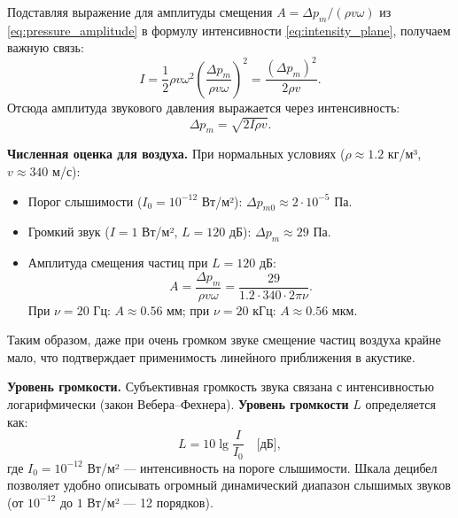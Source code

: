 \begin{property}
Подставляя выражение для амплитуды смещения $A = \Delta p_m / (\rho v \omega)$ из \eqref{eq:pressure_amplitude} в формулу интенсивности \eqref{eq:intensity_plane}, получаем важную связь:
\begin{equation}
    I = \frac{1}{2} \rho v \omega^2 \left(\frac{\Delta p_m}{\rho v \omega}\right)^2 = \frac{(\Delta p_m)^2}{2 \rho v}. \label{eq:intensity_pressure}
\end{equation}
Отсюда амплитуда звукового давления выражается через интенсивность:
\begin{equation}
    \Delta p_m = \sqrt{2 I \rho v}. \label{eq:pressure_from_intensity}
\end{equation}
\end{property}

\begin{remark}
\textbf{Численная оценка для воздуха.} При нормальных условиях ($\rho \approx 1.2$ кг/м³, $v \approx 340$ м/с):
\begin{itemize}
    \item Порог слышимости ($I_0 = 10^{-12}$ Вт/м²): $\Delta p_{m0} \approx 2 \cdot 10^{-5}$ Па.
    \item Громкий звук ($I = 1$ Вт/м², $L = 120$ дБ): $\Delta p_m \approx 29$ Па.
    \item Амплитуда смещения частиц при $L = 120$ дБ:
    \begin{equation}
        A = \frac{\Delta p_m}{\rho v \omega} = \frac{29}{1.2 \cdot 340 \cdot 2\pi \nu}.
    \end{equation}
    При $\nu = 20$ Гц: $A \approx 0.56$ мм; при $\nu = 20$ кГц: $A \approx 0.56$ мкм.
\end{itemize}
Таким образом, даже при очень громком звуке смещение частиц воздуха крайне мало, что подтверждает применимость линейного приближения в акустике.
\end{remark}

\begin{remark}
\textbf{Уровень громкости.} Субъективная громкость звука связана с интенсивностью логарифмически (закон Вебера--Фехнера). \textbf{Уровень громкости} $L$ определяется как:
\begin{equation}
    L = 10 \lg \frac{I}{I_0} \quad \text{[дБ]}, \label{eq:loudness_level}
\end{equation}
где $I_0 = 10^{-12}$ Вт/м² --- интенсивность на пороге слышимости. Шкала децибел позволяет удобно описывать огромный динамический диапазон слышимых звуков (от $10^{-12}$ до $1$ Вт/м² --- 12 порядков).
\end{remark}

